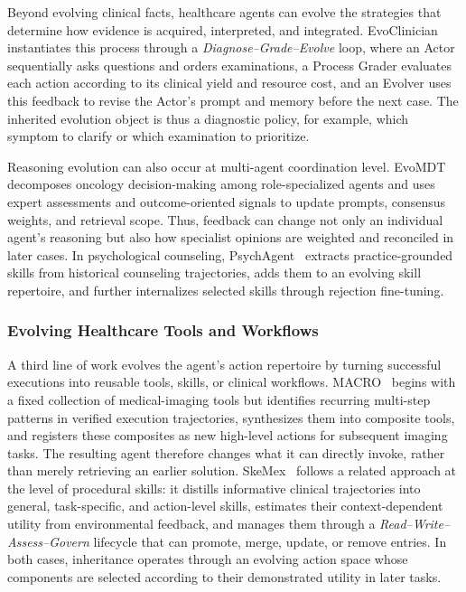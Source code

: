 Beyond evolving clinical facts, healthcare agents can evolve the strategies that determine how evidence is acquired, interpreted, and integrated. EvoClinician~\cite{he2026evoclinician} instantiates this process through a \emph{Diagnose--Grade--Evolve} loop, where an Actor sequentially asks questions and orders examinations, a Process Grader evaluates each action according to its clinical yield and resource cost, and an Evolver uses this feedback to revise the Actor's prompt and memory before the next case. The inherited evolution object is thus a diagnostic policy, for example, which symptom to clarify or which examination to prioritize. 

Reasoning evolution can also occur at multi-agent coordination level. EvoMDT~\cite{liu2026evomdt} decomposes oncology decision-making among role-specialized agents and uses expert assessments and outcome-oriented signals to update prompts, consensus weights, and retrieval scope. Thus, feedback can change not only an individual agent's reasoning but also how specialist opinions are weighted and reconciled in later cases. In psychological counseling, PsychAgent~\cite{yang2026psychagent} extracts practice-grounded skills from historical counseling trajectories, adds them to an evolving skill repertoire, and further internalizes selected skills through rejection fine-tuning. 

\vspace{-1em}
\subsubsection{Evolving Healthcare Tools and Workflows}

A third line of work evolves the agent's action repertoire by turning successful executions into reusable tools, skills, or clinical workflows. MACRO~\cite{fan2026macro} begins with a fixed collection of medical-imaging tools but identifies recurring multi-step patterns in verified execution trajectories, synthesizes them into composite tools, and registers these composites as new high-level actions for subsequent imaging tasks. The resulting agent therefore changes what it can directly invoke, rather than merely retrieving an earlier solution. SkeMex~\cite{sun2026skemex} follows a related approach at the level of procedural skills: it distills informative clinical trajectories into general, task-specific, and action-level skills, estimates their context-dependent utility from environmental feedback, and manages them through a \emph{Read--Write--Assess--Govern} lifecycle that can promote, merge, update, or remove entries. In both cases, inheritance operates through an evolving action space whose components are selected according to their demonstrated utility in later tasks.

